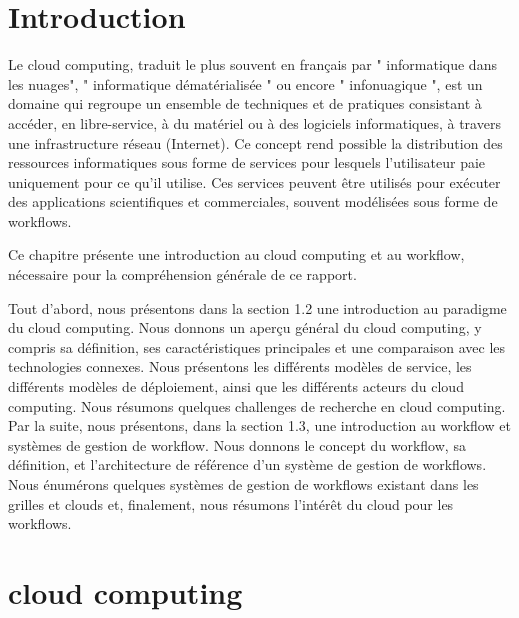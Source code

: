  	 \section{Introduction}
 	  
    
    Le cloud computing, traduit le plus souvent en français par " informatique dans les nuages", " informatique dématérialisée " ou encore " infonuagique ", est un domaine qui regroupe un ensemble de techniques et de pratiques consistant à accéder, en libre-service, à du matériel ou à des logiciels informatiques, à travers une infrastructure réseau (Internet). Ce concept rend possible la distribution des ressources informatiques sous forme de services pour lesquels l'utilisateur paie uniquement pour ce qu'il utilise. Ces services peuvent être utilisés pour exécuter des applications scientifiques et commerciales, souvent modélisées sous forme de workflows.
     
    Ce chapitre présente une introduction au cloud computing et au workflow, nécessaire pour la compréhension générale de ce rapport.
    
    Tout d’abord, nous présentons dans la section 1.2 une introduction au paradigme du cloud computing. Nous donnons un aperçu général du cloud computing, y compris sa définition, ses caractéristiques principales et une comparaison avec les technologies connexes. Nous présentons les différents modèles de service, les différents modèles de déploiement, ainsi que les différents acteurs du cloud computing. Nous résumons quelques challenges de recherche en cloud computing. Par la suite, nous présentons, dans la section 1.3, une introduction au workflow et systèmes de gestion de workflow. Nous donnons le concept du workflow, sa définition, et l’architecture de référence d’un système de gestion de workflows. Nous énumérons quelques systèmes de gestion de workflows existant dans les grilles et clouds et, finalement, nous résumons l’intérêt  du cloud pour les workflows.
    
    \section{cloud computing}
